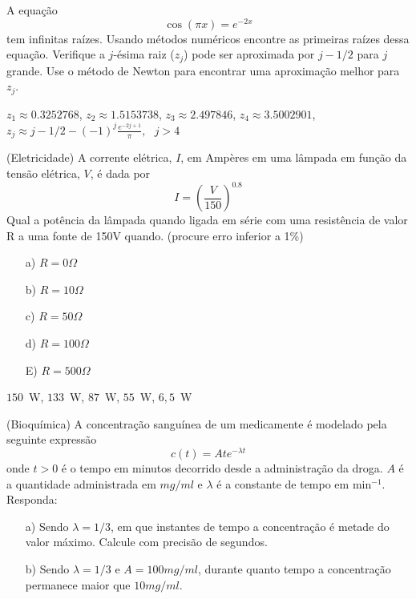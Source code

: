 \begin{exer} A equação \begin{equation} \cos(\pi x)=e^{-2x} \end{equation} tem infinitas raízes.
Usando  métodos numéricos encontre as primeiras raízes dessa equação. Verifique a $j$-ésima raiz ($z_j$) pode ser aproximada por $j-1/2$ para $j$ grande. Use o método de Newton para encontrar uma aproximação melhor para $z_j$.
\end{exer}
\begin{resp}

 $z_1\approx 0.3252768 $, $z_2\approx 1.5153738$, $z_3\approx 2.497846  $, $z_4\approx 3.5002901$, $z_j\approx j-1/2-(-1)^j\frac{e^{-2j+1}}{\pi}, ~~~j>4$

\end{resp}


\begin{exer}(Eletricidade) A corrente elétrica, $I$, em Ampères em uma lâmpada em função da tensão elétrica, $V$, é dada por
\begin{equation} I=\left(\frac{V}{150}\right)^{0.8} \end{equation}
Qual a potência da lâmpada quando ligada em série com uma resistência de valor R a uma fonte de 150V quando. (procure erro inferior a 1\%)
\begin{itemize}
\item [a)] $R=0\Omega$
\item [b)] $R=10\Omega$
\item [c)] $R=50\Omega$
\item [d)] $R=100\Omega$
\item [E)] $R=500\Omega$
\end{itemize}
\end{exer}
\begin{resp}

$150$~W, $133$~W, $87$~W, $55$~W, $6,5$~W

\end{resp}




\begin{exer} (Bioquímica) A concentração sanguínea de um medicamente é modelado pela seguinte expressão
\begin{equation} c(t)=Ate^{-\lambda t} \end{equation}
onde $t>0$ é o tempo em minutos decorrido desde a administração da droga. $A$ é a quantidade administrada em $mg/ml$ e $\lambda$ é a constante de tempo em min$^{-1}$.
Responda:
\begin{itemize}
\item[a)] Sendo $\lambda=1/3$, em que instantes de tempo a concentração é metade do valor máximo. Calcule com precisão de segundos.
\item[b)] Sendo $\lambda=1/3$ e $A=100mg/ml$, durante quanto tempo a concentração permanece maior que $10mg/ml$.
\end{itemize}
\end{exer}

